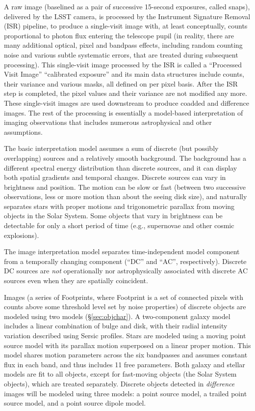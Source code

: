 \documentclass[SE,lsstdraft,toc]{lsstdoc}
\newcommand{\oldtext}[1]{{\color{red} #1}}
\newcommand{\newtext}[1]{{\color{blue} #1}}
\begin{document}
 A raw image (baselined as a pair of successive 15-second exposures, called snaps),
delivered by the LSST camera, is processed by the Instrument Signature
Removal (ISR) pipeline, to produce a single-visit image with, at least
conceptually, counts proportional to photon flux entering the
telescope pupil (in reality, there are many additional optical, pixel and
bandpass effects, including random counting noise and various subtle
systematic errors, that are treated during subsequent processing).
This single-visit image processed by the ISR is called a \newtext{``Processed Visit Image''} \oldtext{``calibrated
exposure''} and its main data structures include counts, their variance and
various masks, all defined on per pixel basis. After the ISR step is
completed, the pixel values and their variance are not modified any more.
These single-visit images are used downstream to produce coadded and difference
images. The rest of the processing is essentially a model-based interpretation
of imaging observations that includes numerous astrophysical and other
assumptions.

The basic interpretation model assumes a sum of discrete (but possibly overlapping)
sources and a relatively smooth background. The background has a different
spectral energy distribution than discrete sources, and it can display both
spatial gradients and temporal changes. Discrete sources can vary
in brightness and position. The motion can be slow or fast (between two successive observations,
less or more motion than about the seeing disk size), and naturally separates stars
with proper motions and trigonometric parallax from moving objects in the Solar System.
Some objects that vary in brightness can be detectable for only a short period of time
(e.g., supernovae and other cosmic explosions).

The image interpretation model separates time-independent model
component from a temporally changing component (``DC'' and ``AC'',
respectively). Discrete DC sources are \textit{not} operationally nor astrophysically
associated with discrete AC sources even when they are spatially coincident.

Images (a series of Footprints, where Footprint is a set of connected pixels with
counts above some threshold level set by noise properties) of discrete objects are
modeled using two models (\S\ref{sec:objchar}). A two-component galaxy model includes a linear
combination of bulge and disk, with their radial intensity variation described using
Sersic profiles.
Stars are modeled using a moving point source model with its parallax motion
superposed on a linear proper motion. This model shares motion parameters across
the six bandpasses and assumes constant flux in each band, and thus includes
11 free parameters. Both galaxy and stellar models are fit to all objects, except
for fast-moving objects (the Solar System objects), which are treated separately.
Discrete objects detected in \emph{difference} images will be modeled using three models:
a point source model, a trailed point source model, and a point source dipole model.
\end{document}
